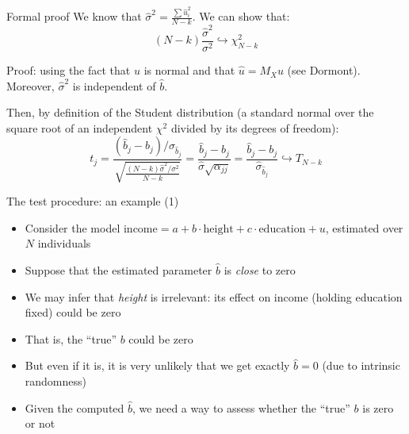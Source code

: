 \documentclass[aspectratio=169]{beamer}
\begin{document}
\begin{frame}{Formal proof}
We know that $\hat{\sigma}^2 = \frac{\sum \hat{u}_i^2}{N-k}$. We can show that:
\[
(N-k)\frac{\hat{\sigma}^2}{\sigma^2} \hookrightarrow \chi_{N-k}^2
\]

Proof: using the fact that $u$ is normal and that $\hat{u} = M_X u$ (see Dormont). Moreover, $\hat{\sigma}^2$ is independent of $\hat{b}$.

Then, by definition of the Student distribution (a standard normal over the square root of an independent $\chi^2$ divided by its degrees of freedom):
\[
t_j = \frac{(\hat{b}_j - b_j)/\sigma_{\hat{b}_j}}{\sqrt{\frac{(N-k)\hat{\sigma}^2/\sigma^2}{N-k}}} = \frac{\hat{b}_j - b_j}{\hat{\sigma}\sqrt{\alpha_{jj}}} = \frac{\hat{b}_j - b_j}{\hat{\sigma}_{\hat{b}_j}} \hookrightarrow T_{N-k}
\]
\end{frame}

\begin{frame}{The test procedure: an example (1)}
\begin{itemize}
    \item Consider the model $\text{income} = a + b \cdot \text{height} + c \cdot \text{education} + u$, estimated over $N$ individuals
    \item Suppose that the estimated parameter $\hat{b}$ is \textit{close} to zero
    \item We may infer that \textit{height} is irrelevant: its effect on income (holding education fixed) could be zero
    \item That is, the ``true'' $b$ could be zero
    \item But even if it is, it is very unlikely that we get exactly $\hat{b} = 0$ (due to intrinsic randomness)
    \item Given the computed $\hat{b}$, we need a way to assess whether the ``true'' $b$ is zero or not
\end{itemize}
\end{frame}
\end{document}
